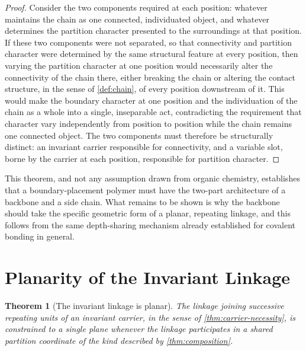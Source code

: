 \documentclass[11pt,twocolumn,a4paper]{article}
\theoremstyle{plain}
\newtheorem{theorem}{Theorem}[section]
\theoremstyle{definition}
\theoremstyle{remark}
\begin{document}
\begin{proof}
Consider the two components required at each position: whatever maintains
the chain as one connected, individuated object, and whatever determines
the partition character presented to the surroundings at that position. If
these two components were not separated, so that connectivity and partition
character were determined by the same structural feature at every position,
then varying the partition character at one position would necessarily
alter the connectivity of the chain there, either breaking the chain or
altering the contact structure, in the sense of \cref{def:chain}, of every
position downstream of it. This would make the boundary character at one
position and the individuation of the chain as a whole into a single,
inseparable act, contradicting the requirement that character vary
independently from position to position while the chain remains one
connected object. The two components must therefore be structurally
distinct: an invariant carrier responsible for connectivity, and a variable
slot, borne by the carrier at each position, responsible for partition
character.
\end{proof}

This theorem, and not any assumption drawn from organic chemistry,
establishes that a boundary-placement polymer must have the two-part
architecture of a backbone and a side chain. What remains to be shown is
why the backbone should take the specific geometric form of a planar,
repeating linkage, and this follows from the same depth-sharing mechanism
already established for covalent bonding in general.

\section{Planarity of the Invariant Linkage}
\label{sec:planarity}

\begin{theorem}[The invariant linkage is planar]
\label{thm:planarity}
The linkage joining successive repeating units of an invariant carrier, in
the sense of \cref{thm:carrier-necessity}, is constrained to a single plane
whenever the linkage participates in a shared partition coordinate of the
kind described by \cref{thm:composition}.
\end{theorem}
\end{document}
